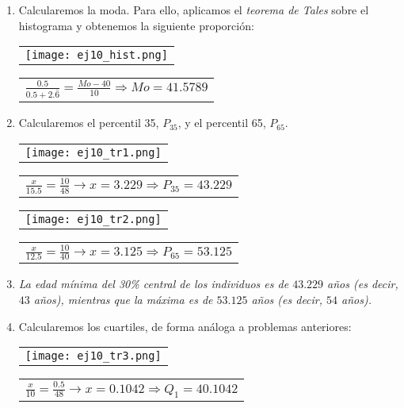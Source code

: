 \documentclass[11pt,a4paper]{article}
\theoremstyle{definition}
\begin{document}
\begin{enumerate}[label=\emph{\alph*})]
	\item Calcularemos la moda. Para ello, aplicamos el \emph{teorema de Tales} sobre el histograma y obtenemos la siguiente proporción: 


\begin{table}[!htbp]
\hspace*{1.1 cm}
\begin{tabular}{c}
\texttt{[image: ej10\_hist.png]} \\
\end{tabular}
{
\begin{tabular}{l}
$ \frac{0.5}{0.5+2.\bar{6}} = \frac{Mo-40}{10} \Rightarrow Mo = 41.5789$
\end{tabular}}

\end{table}

\pagebreak
	\item Calcularemos el percentil 35, $P_{35}$, y el percentil 65, $P_{65}$.

\begin{table}[!htbp]
\hspace*{1.1 cm}
\begin{tabular}{c}
\texttt{[image: ej10\_tr1.png]} \\
\end{tabular}
{
\begin{tabular}{l}
$ \frac{x}{15.5}=\frac{10}{48} \rightarrow x = 3.229 \Rightarrow P_{35} = 43.229 $
\end{tabular}}

\hspace*{1.1 cm}
\begin{tabular}{c}
\texttt{[image: ej10\_tr2.png]} \\
\end{tabular}
{
\begin{tabular}{l}
$ \frac{x}{12.5}=\frac{10}{40} \rightarrow x = 3.125 \Rightarrow P_{65} = 53.125 $
\end{tabular}}

\end{table}
	\item[] \emph{La edad mínima del 30\% central de los individuos es de $43.229$ años (es decir, $43$ años), mientras que la máxima es de $53.125$ años (es decir, $54$ años).} \\
	\item Calcularemos los cuartiles, de forma análoga a problemas anteriores:
	\begin{table}[!htbp]
\hspace*{1.1 cm}
\begin{tabular}{c}
\texttt{[image: ej10\_tr3.png]} \\
\end{tabular}
{
\begin{tabular}{l}
$ \frac{x}{10}=\frac{0.5}{48} \rightarrow x = 0.1042 \Rightarrow Q_{1}= 40.1042 $
\end{tabular}}


\end{table}
\end{enumerate}
\end{document}
